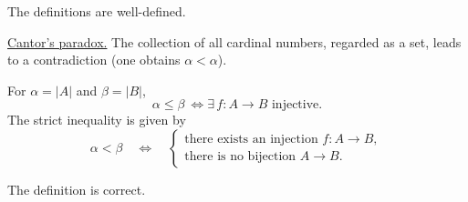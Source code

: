 \noindent The definitions are well-defined.

\medskip
\noindent\underline{Cantor's paradox.}
The collection of all cardinal numbers, regarded as a set,
leads to a contradiction (one obtains $\alpha<\alpha$).

\medskip
\noindent For $\alpha=|A|$ and $\beta=|B|$,
\[
\alpha\leq\beta\ \iff
\exists\, f:A\longrightarrow B\text{ injective}.
\]
The strict inequality is given by
\[
\alpha<\beta\quad\iff\quad
\begin{cases}
\text{there exists an injection }f:A\longrightarrow B,\\
\text{there is no bijection }A\longrightarrow B.
\end{cases}
\]

\noindent The definition is correct.
\endgroup
